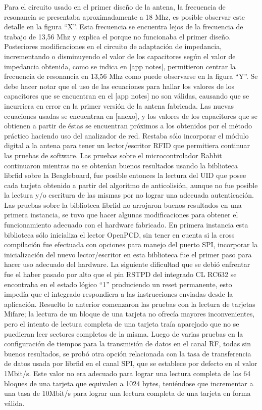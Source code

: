 Para el circuito usado en el primer diseño de la antena, la frecuencia de resonancia se presentaba aproximadamente a 18 Mhz, es posible observar este detalle en la figura “X”. Esta frecuencia se encuentra lejos de la frecuencia de trabajo de 13,56 Mhz y explica el porque no funcionaba el primer diseño. Posteriores modificaciones en el circuito de adaptación de impedancia, incrementando o disminuyendo el valor de los capacitores según el valor de impedancia obtenida, como se indica en [app notes],  permitieron centrar la frecuencia de resonancia en 13,56 Mhz como puede observarse en la figura “Y”.  Se debe hacer notar que el uso de las ecuaciones para hallar los valores de los capacitores que se encuentran en el [app notes] no son válidas, causando que se incurriera en error en la primer versión de la antena fabricada.  Las nuevas ecuaciones usadas se encuentran en [anexo], y los valores de los capacitores que se obtienen a partir de éstas se encuentran próximos a los obtenidos por el método práctico haciendo uso del analizador de red.
Restaba sólo incorporar el módulo digital a la antena para tener un lector/escritor RFID que permitiera continuar las pruebas de software.
Las pruebas sobre el microcontrolador Rabbit continuaron mientras no se obtenían buenos resultados usando la biblioteca librfid sobre la Beagleboard, fue posible entonces la lectura del UID que posee cada tarjeta obtenido a partir del algoritmo de anticolisión, aunque no fue posible la lectura y/o escritura de las mismas por no lograr una adecuada autenticación.
Las pruebas sobre la biblioteca librfid no arrojaron buenos resultados en una primera instancia, se tuvo que hacer algunas modificaciones para obtener el funcionamiento adecuado con el hardware fabricado. En primera instancia esta biblioteca sólo inicializa el lector OpenPCD, sin tener en cuenta si la cross compilación fue efectuada con opciones para manejo del puerto SPI, incorporar la inicialización del nuevo lector/escritor en esta biblioteca fue el primer paso para hacer uso adecuado del hardware. 
La siguiente dificultad que se debió enfrentar fue el haber pasado por alto que el pin RSTPD del integrado CL RC632 se encontraba en el estado lógico “1” produciendo un reset permanente, esto impedía que el integrado respondiera a las instrucciones enviadas desde la aplicación.
Resuelto lo anterior comenzaron las pruebas con la lectura de tarjetas Mifare; la lectura de un bloque de una tarjeta no ofrecía mayores inconvenientes, pero el intento de lectura completa de una tarjeta traía aparejado que no se puedieran leer sectores completos de la misma. Luego de varias pruebas en la configuración de tiempos para la transmisión de datos en el canal RF, todas sin buenos resultados, se probó otra opción relacionada con la tasa de transferencia de datos usada por librfid en el canal SPI, que se establece por defecto en el valor 1Mbit/s. Este valor no era adecuado para lograr una lectura completa de los 64 bloques de una tarjeta que equivalen a 1024 bytes, teniéndose que incrementar a una tasa de 10Mbit/s para lograr una lectura completa de una tarjeta en forma válida.
